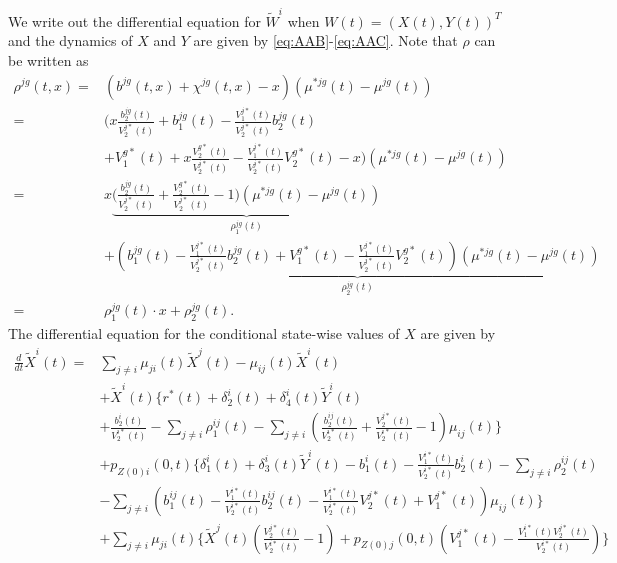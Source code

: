 \documentclass[12pt]{article}
\theoremstyle{my_thm}
\begin{document}
We write out the differential equation for $\tilde{W}^i$ when $W(t)=(X(t),Y(t))^T$ and the dynamics of $X$ and $Y$ are given by \eqref{eq:AAB}-\eqref{eq:AAC}. Note that $\rho$ can be written as
\begin{align*}
\rho^{jg}(t,x)=&
(b^{jg}(t,x)+ \chi^{jg}(t,x)-x) (\mu^{*jg}(t)-\mu^{jg}(t))
\\
=& 
\bigg( x \frac{b_2^{jg}(t)}{V_2^{j*}(t)} + b_1^{jg}(t) -  \frac{V_1^{j*}(t)}{V_2^{j*}(t)}b_2^{jg}(t)
\\
& + V^{g*}_1(t) + x\frac{V^{g*}_2(t)}{V^{j*}_2(t)}-\frac{V^{j*}_1(t)}{V^{j*}_2(t)}V^{g*}_2(t)-x \bigg) (\mu^{*jg}(t)-\mu^{jg}(t))
\\
=& 
x\underbrace{\bigg(  \frac{b_2^{jg}(t)}{V_2^{j*}(t)} + \frac{V^{g*}_2(t)}{V^{j*}_2(t)}-1 \bigg) (\mu^{*jg}(t)-\mu^{jg}(t))}_{\rho^{jg}_1(t)}
\\
&+
\underbrace{\left( b_1^{jg}(t) -  \frac{V_1^{j*}(t)}{V_2^{j*}(t)}b_2^{jg}(t)
+ V^{g*}_1(t)
-\frac{V^{j*}_1(t)}{V^{j*}_2(t)}V^{g*}_2(t) \right)(\mu^{*jg}(t)-\mu^{jg}(t))}_{\rho^{jg}_2(t)}
\\
=&
\rho_1^{jg}(t)\cdot x+\rho_2^{jg}(t).
\end{align*}
The differential equation for the conditional state-wise values of $X$ are given by
\begin{align*}
\frac{d}{dt}\tilde{X}^i(t)=& \sum_{j \neq i} \mu_{ji}(t) \tilde{X}^j(t)-\mu_{ij}(t)\tilde{X}^i(t)
\\
&+ \tilde{X}^i(t) \Bigg\lbrace 
r^*(t)  +\delta_2^i(t)+\delta_4^i(t)\tilde{Y}^i(t) \\
&+\frac{b^i_2(t)}{V_2^{i*}(t)}
-\sum_{j \neq i} \rho_1^{ij}(t)
-\sum_{j \neq i} \left(\frac{b^{ij}_2(t)}{V_2^{i*}(t)} + \frac{V^{j*}_2(t)}{V^{i*}_2(t)}-1 \right) \mu_{ij}(t)  \Bigg\rbrace
\\
&+
 p_{Z(0)i}(0,t)\Bigg\lbrace 
\delta_1^i(t)
+\delta_3^i(t)\tilde{Y}^i(t)
-b_1^i(t)
-\frac{V_1^{i*}(t)}{V_2^{i*}(t)}b^i_2(t)
-\sum_{j \neq i} \rho_2^{ij}(t)
\\
&- \sum_{j \neq i} \left( b_1^{ij}(t)-\frac{V_1^{i*}(t)}{V_2^{i*}(t)}b^{ij}_2(t) -\frac{V^{i*}_1(t)}{V^{i*}_2(t)}V^{j*}_2(t)+V^{j*}_1(t) \right) \mu_{ij}(t) \Bigg\rbrace
\\
&+
\sum_{j \neq i} \mu_{ji}(t)\Bigg\lbrace
\tilde{X}^j(t)\left( \frac{V^{j*}_2(t)}{V^{i*}_2(t)}-1 \right)
+p_{Z(0)j}(0,t) \left(V^{j*}_1(t) - \frac{V^{i*}_1(t)V^{j*}_2(t)}{V^{i*}_2(t)}\right)
\Bigg\rbrace
\end{align*}

\newpage


\end{document}
